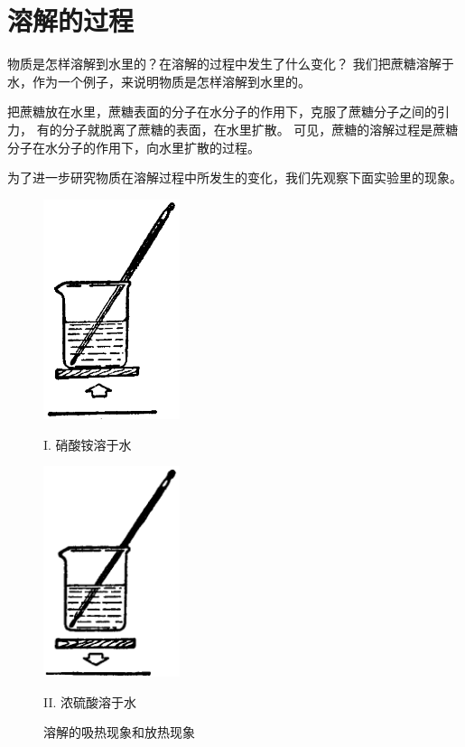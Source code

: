 \section{溶解的过程}\label{sec:4-2}

物质是怎样溶解到水里的？在溶解的过程中发生了什么变化？
我们把蔗糖溶解于水，作为一个例子，来说明物质是怎样溶解到水里的。

把蔗糖放在水里，蔗糖表面的分子在水分子的作用下，克服了蔗糖分子之间的引力，
有的分子就脱离了蔗糖的表面，在水里扩散。
可见，蔗糖的溶解过程是蔗糖分子在水分子的作用下，向水里扩散的过程。

为了进一步研究物质在溶解过程中所发生的变化，我们先观察下面实验里的现象。

\begin{figure}[htbp]
    \centering
    \begin{minipage}[b]{7cm}
        \centering
        \includegraphics[width=4cm]{../pic/czhx1-ch4-1-1}
        \caption*{I. 硝酸铵溶于水}
    \end{minipage}
    \qquad
    \begin{minipage}[b]{7cm}
        \centering
        \includegraphics[width=4cm]{../pic/czhx1-ch4-1-2}
        \caption*{II. 浓硫酸溶于水}
    \end{minipage}
    \caption{溶解的吸热现象和放热现象}\label{fig:4-1}
\end{figure}

